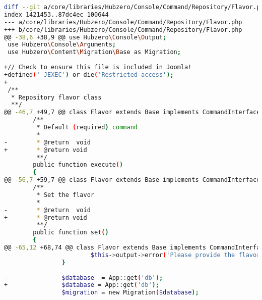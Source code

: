 \documentclass[10pt,letterpaper,titlepage]{article}
\begin{document}
\begin{lstlisting}[caption={Style for commit messages used in HubZERO web development.},language=Bash,label=badcommit]
diff --git a/core/libraries/Hubzero/Console/Command/Repository/Flavor.php b/core/libraries/Hubzero/Console/Command/Repository/Flavor.php
index 1421453..87dc4ec 100644
--- a/core/libraries/Hubzero/Console/Command/Repository/Flavor.php
+++ b/core/libraries/Hubzero/Console/Command/Repository/Flavor.php
@@ -38,6 +38,9 @@ use Hubzero\Console\Output;
 use Hubzero\Console\Arguments;
 use Hubzero\Content\Migration\Base as Migration;
 
+// Check to ensure this file is included in Joomla!
+defined('_JEXEC') or die('Restricted access');
+
 /**
  * Repository flavor class
  **/
@@ -46,7 +49,7 @@ class Flavor extends Base implements CommandInterface
        /**
         * Default (required) command
         *
-        * @return  void
+        * @return void
         **/
        public function execute()
        {
@@ -56,7 +59,7 @@ class Flavor extends Base implements CommandInterface
        /**
         * Set the flavor
         *
-        * @return  void
+        * @return void
         **/
        public function set()
        {
@@ -65,12 +68,74 @@ class Flavor extends Base implements CommandInterface
                        $this->output->error('Please provide the flavor you would like to use');
                }
 
-               $database  = App::get('db');
+               $database = App::get('db');
                $migration = new Migration($database);
 

\end{lstlisting}
\end{document}
